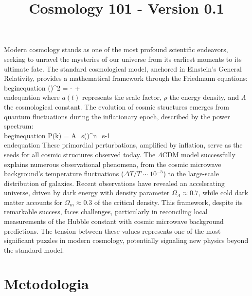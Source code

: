 \documentclass{article}\usepackage{graphicx} \usepackage{amsmath} \usepackage{colortbl}\title{Cosmology 101 - Version 0.1}
\begin{document}
Modern cosmology stands as one of the most profound scientific endeavors, seeking to unravel the mysteries of our universe from its earliest moments to its ultimate fate. The standard cosmological model, anchored in Einstein's General Relativity, provides a mathematical framework through the Friedmann equations:  \\begin{equation} \left(\right)^2 = \rho -  +  \\end{equation}  where $a(t)$ represents the scale factor, $\rho$ the energy density, and $\Lambda$ the cosmological constant. The evolution of cosmic structures emerges from quantum fluctuations during the inflationary epoch, described by the power spectrum:  \\begin{equation} P(k) = A_s\left(\right)^{n_s-1} \\end{equation}  These primordial perturbations, amplified by inflation, serve as the seeds for all cosmic structures observed today. The $\Lambda$CDM model successfully explains numerous observational phenomena, from the cosmic microwave background's temperature fluctuations ($\Delta T/T \sim 10^{-5}$) to the large-scale distribution of galaxies. Recent observations have revealed an accelerating universe, driven by dark energy with density parameter $\Omega_\Lambda \approx 0.7$, while cold dark matter accounts for $\Omega_m \approx 0.3$ of the critical density. This framework, despite its remarkable success, faces challenges, particularly in reconciling local measurements of the Hubble constant with cosmic microwave background predictions. The tension between these values represents one of the most significant puzzles in modern cosmology, potentially signaling new physics beyond the standard model.\section{Metodologia}
\end{document}
